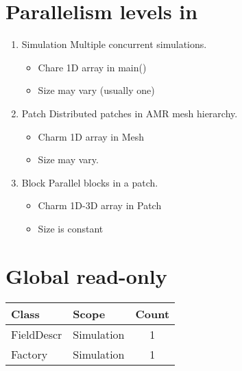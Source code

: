 \documentclass{article}[12pt]
\begin{document}

\tableofcontents

\section{Parallelism levels in \enzop}

\begin{enumerate}
\item Simulation  
  Multiple concurrent simulations.
  \begin{itemize}
  \item Chare 1D array in main()
  \item Size may vary (usually one)
  \end{itemize}
\item Patch  
  Distributed patches in AMR mesh hierarchy. 
  \begin{itemize}
  \item Charm 1D array in Mesh
  \item Size may vary.
  \end{itemize}
\item Block
  Parallel blocks in a patch.
  \begin{itemize}
  \item Charm 1D-3D array in Patch
  \item Size is constant
  \end{itemize}
\end{enumerate}

\section{Global read-only}
\begin{tabular}{llc}
  Class      &   Scope    &  Count \\ \hline
  FieldDescr & Simulation &     1 \\
  Factory    & Simulation &     1 
\end{tabular}
\end{document}
